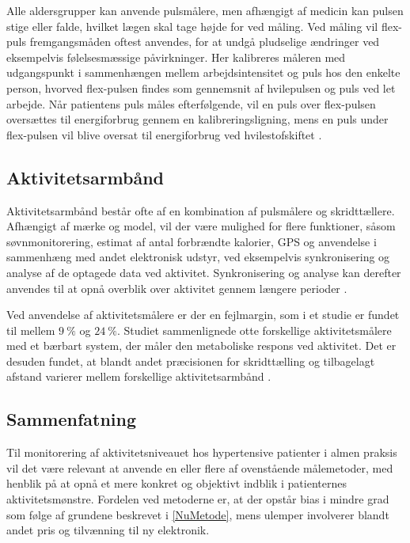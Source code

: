Alle aldersgrupper kan anvende pulsmålere, men afhængigt af medicin kan pulsen stige eller falde, hvilket lægen skal tage højde for ved måling. Ved måling vil flex-puls fremgangsmåden oftest anvendes, for at undgå pludselige ændringer ved eksempelvis følelsesmæssige påvirkninger. Her kalibreres måleren med udgangspunkt i sammenhængen mellem arbejdsintensitet og puls hos den enkelte person, hvorved flex-pulsen findes som gennemsnit af hvilepulsen og puls ved let arbejde. Når patientens puls måles efterfølgende, vil en puls over flex-pulsen oversættes til energiforbrug gennem en kalibreringsligning, mens en puls under flex-pulsen vil blive oversat til energiforbrug ved hvilestofskiftet \citep{motionsraad2007}.

\subsection{Aktivitetsarmbånd}

Aktivitetsarmbånd består ofte af en kombination af pulsmålere og skridttællere. Afhængigt af mærke og model, vil der være mulighed for flere funktioner, såsom søvnmonitorering, estimat af antal forbrændte kalorier, GPS og anvendelse i sammenhæng med andet elektronisk udstyr, ved eksempelvis synkronisering og analyse af de optagede data ved aktivitet. Synkronisering og analyse kan derefter anvendes til at opnå overblik over aktivitet gennem længere perioder \citep{pedersen2011, rudner2016, chiauzzi2014}.

Ved anvendelse af aktivitetsmålere er der en fejlmargin, som i et studie er fundet til mellem $9~\%$ og $24~\%$. Studiet sammenlignede otte forskellige aktivitetsmålere med et bærbart system, der måler den metaboliske respons ved aktivitet. Det er desuden fundet, at blandt andet præcisionen for skridttælling og tilbagelagt afstand varierer mellem forskellige aktivitetsarmbånd \citep{chiauzzi2014}.

\subsection{Sammenfatning} \label{sec:prob_sammenfatning}

Til monitorering af aktivitetsniveauet hos hypertensive patienter i almen praksis vil det være relevant at anvende en eller flere af ovenstående målemetoder, med henblik på at opnå et mere konkret og objektivt indblik i patienternes aktivitetsmønstre. Fordelen ved metoderne er, at der opstår bias i mindre grad som følge af grundene beskrevet i \autoref{NuMetode}, mens ulemper involverer blandt andet pris og tilvænning til ny elektronik. 

